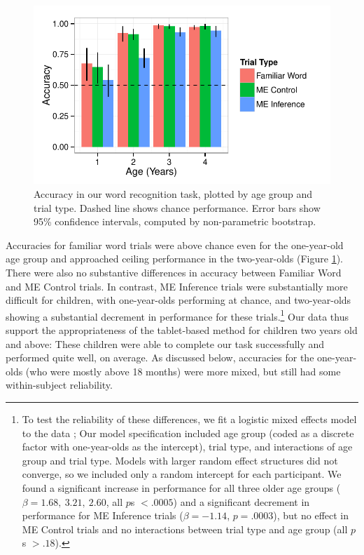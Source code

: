 \documentclass[man,noapacite]{apa2}
\begin{document}
\begin{figure}[t] 
  \begin{center} 
    \includegraphics[width=5in]{figures/accuracy.pdf} 
    \caption{\label{fig:accuracy} Accuracy in our word recognition task, plotted by age group and trial type. Dashed line shows chance performance. Error bars show 95\% confidence intervals, computed by non-parametric bootstrap. }
  \end{center} 
\end{figure}

Accuracies for familiar word trials were above chance even for the one-year-old age group and approached ceiling performance in the two-year-olds (Figure \ref{fig:accuracy}). There were also no substantive differences in accuracy between Familiar Word and ME Control trials. In contrast, ME Inference trials were substantially more difficult for children, with one-year-olds performing at chance, and two-year-olds showing a substantial decrement in performance for these trials.\footnote{To test the reliability of these differences, we fit a logistic mixed effects model to the data \cite{jaeger2008}; Our model specification included age group (coded as a discrete factor with one-year-olds as the intercept), trial type, and interactions of age group and trial type. Models with larger random effect structures did not converge, so we included only a random intercept for each participant. We found a significant increase in performance for all three older age groups ($\beta = 1.68,~3.21,~2.60$, all $p$s $< .0005$) and a significant decrement in performance for ME Inference trials  ($\beta = -1.14$, $p = .0003$), but no effect in ME Control trials and no interactions between trial type and age group (all $p$s $> .18$). 
} 
Our data thus support the appropriateness of the tablet-based method for children two years old and above: These children were able to complete our task successfully and performed quite well, on average. As discussed below, accuracies for the one-year-olds (who were mostly above 18 months) were more mixed, but still had some within-subject reliability.
\end{document}
